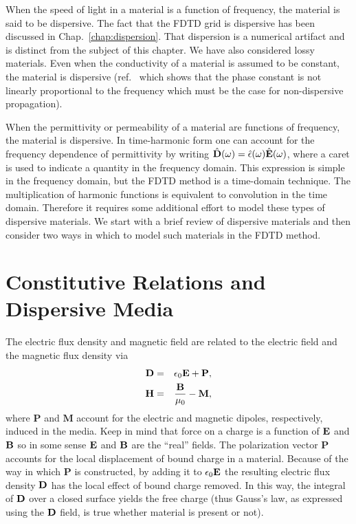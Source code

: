 When the speed of light in a material is a function of frequency, the
material is said to be dispersive.  The fact that the FDTD grid is
dispersive has been discussed in Chap.\ \ref{chap:dispersion}.  That
dispersion is a numerical artifact and is distinct from the 
subject of this chapter.  We have also considered lossy materials.
Even when the conductivity of a material is assumed to be constant,
the material is dispersive (ref.\  which shows that
the phase constant is not linearly proportional to the frequency which
must be the case for non-dispersive propagation).

When the permittivity or permeability of a material are functions of
frequency, the material is dispersive.  In time-harmonic form one can
account for the frequency dependence of permittivity by writing
$\hat{\mathbf{D}}(\omega)=\hat{\epsilon}(\omega)\hat{\mathbf{E}}(\omega)$, where a caret
is used to indicate a quantity in the frequency domain.  This
expression is simple in the frequency domain, but the FDTD method is a
time-domain technique.  The multiplication of harmonic functions is
equivalent to convolution in the time domain.  Therefore it requires
some additional effort to model these types of dispersive materials.
We start with a brief review of dispersive materials and then consider
two ways in which to model such materials in the FDTD method.

\section{Constitutive Relations and Dispersive Media}

The electric flux density and magnetic field are related to the
electric field and the magnetic flux density via
\begin{eqnarray}
  \mathbf{D} &=& \epsilon_0 \mathbf{E} + \mathbf{P}, \label{eq:dAndEAndP}\\
  \mathbf{H} &=& \frac{\mathbf{B}}{\mu_0} - \mathbf{M}, \label{eq:hAndBAndM}
\end{eqnarray}
where $\mathbf{P}$ and $\mathbf{M}$ account for the electric and
magnetic dipoles, respectively, induced in the media.  Keep in mind
that force on a charge is a function of $\mathbf{E}$ and $\mathbf{B}$ so in some
sense $\mathbf{E}$ and $\mathbf{B}$ are the ``real'' fields.  The polarization
vector $\mathbf{P}$ accounts for the local displacement of bound
charge in a material.  Because of the way in which $\mathbf{P}$ is
constructed, by adding it to $\epsilon_0\mathbf{E}$ the resulting electric
flux density $\mathbf{D}$ has the local effect of bound charge removed.  In
this way, the integral of $\mathbf{D}$ over a closed surface yields the
free charge (thus Gauss's law, as expressed using the $\mathbf{D}$ field,
is true whether material is present or not).

